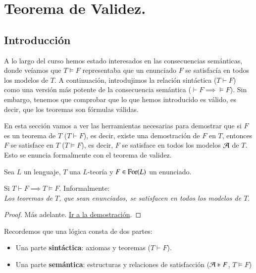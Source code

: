 
\chapter{Teorema de Validez.}

\section{Introducción}

A lo largo del curso hemos estado interesados en las consecuencias semánticas, donde veíamos que $T \vDash F$ representaba que un enunciado $F$ se satisfacía en todos los modelos de $T$. A continuación, introdujimos la relación sintáctica ($T \vdash F$) como una versión más potente de la consecuencia semántica ($\vdash F \implies \vDash F$). Sin embargo, tenemos que comprobar que lo que hemos introducido es válido, es decir, que los teoremas son fórmulas válidas.

En esta sección vamos a ver las herramientas necesarias para demostrar que si $F$ es un teorema de $T$ ($T \vdash F$), es decir, existe una demostración de $F$ en $T$, entonces $F$ se satisface en $T$ ($T \vDash F$), es decir, $F$ se satisface en todos los modelos $\mathcal{A}$ de $T$. Esto se enuncia formalmente con el teorema de validez.

\begin{thm}\label{thm:tv}
    Sea $L$ un lenguaje, $T$ una $L$-teoría y $F \in \mathrm{For}(L)$ un enunciado.
    \begin{center}
        Si $T \vdash F \implies T \vDash F$. Informalmente:\\
        \textit{Los teoremas de $T$, que sean enunciados, se satisfacen en todos los modelos de $T$}.
    \end{center}
\end{thm}
\begin{proof}
    Más adelante. \hyperref[proof:tv]{Ir a la demostración}.
\end{proof}

Recordemos que una lógica consta de dos partes:
\begin{itemize}
    \item Una parte \textbf{sintáctica}: axiomas y teoremas ($T \vdash F$).
    \item Una parte \textbf{semántica}: estructuras y relaciones de satisfacción ($\mathcal{A} \vDash F$, $T \vDash F$)
\end{itemize}

